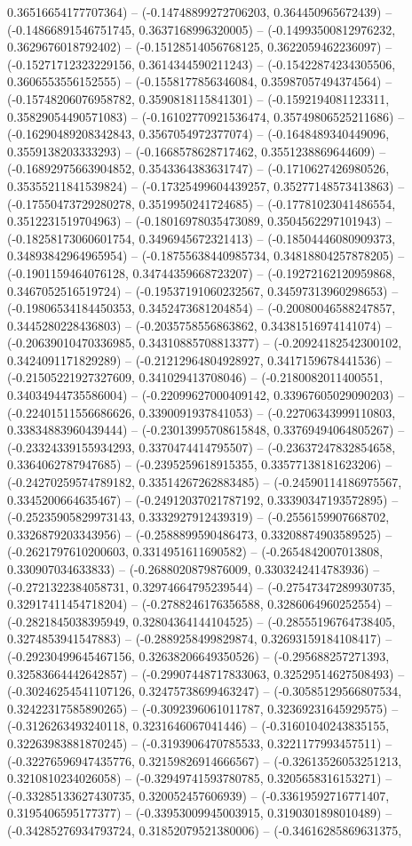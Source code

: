 0.36516654177707364) -- (-0.14748899272706203, 0.364450965672439) -- (-0.14866891546751745, 0.3637168996320005) -- (-0.14993500812976232, 0.3629676018792402) -- (-0.15128514056768125, 0.3622059462236097) -- (-0.15271712323229156, 0.3614344590211243) -- (-0.15422874234305506, 0.3606553556152555) -- (-0.1558177856346084, 0.35987057494374564) -- (-0.15748206076958782, 0.3590818115841301) -- (-0.1592194081123311, 0.35829054490571083) -- (-0.16102770921536474, 0.35749806525211686) -- (-0.16290489208342843, 0.3567054972377074) -- (-0.1648489340449096, 0.3559138203333293) -- (-0.1668578628717462, 0.3551238869644609) -- (-0.16892975663904852, 0.3543364383631747) -- (-0.1710627426980526, 0.35355211841539824) -- (-0.17325499604439257, 0.35277148573413863) -- (-0.17550473729280278, 0.3519950241724685) -- (-0.17781023041486554, 0.3512231519704963) -- (-0.18016978035473089, 0.3504562297101943) -- (-0.18258173060601754, 0.3496945672321413) -- (-0.18504446080909373, 0.34893842964965954) -- (-0.18755638440985734, 0.34818804257878205) -- (-0.1901159464076128, 0.34744359668723207) -- (-0.19272162120959868, 0.3467052516519724) -- (-0.19537191060232567, 0.34597313960298653) -- (-0.19806534184450353, 0.3452473681204854) -- (-0.20080046588247857, 0.3445280228436803) -- (-0.2035758556863862, 0.34381516974141074) -- (-0.20639010470336985, 0.34310885708813377) -- (-0.20924182542300102, 0.3424091171829289) -- (-0.21212964804928927, 0.3417159678441536) -- (-0.21505221927327609, 0.341029413708046) -- (-0.2180082011400551, 0.34034944735586004) -- (-0.22099627000409142, 0.33967605029090203) -- (-0.22401511556686626, 0.3390091937841053) -- (-0.22706343999110803, 0.33834883960439444) -- (-0.23013995708615848, 0.33769494064805267) -- (-0.23324339155934293, 0.3370474414795507) -- (-0.23637247832854658, 0.3364062787947685) -- (-0.2395259618915355, 0.33577138181623206) -- (-0.24270259574789182, 0.33514267262883485) -- (-0.24590114186975567, 0.3345200664635467) -- (-0.24912037021787192, 0.33390347193572895) -- (-0.25235905829973143, 0.3332927912439319) -- (-0.2556159907668702, 0.3326879203343956) -- (-0.2588899590486473, 0.33208874903589525) -- (-0.2621797610200603, 0.3314951611690582) -- (-0.2654842007013808, 0.330907034633833) -- (-0.2688020879876009, 0.3303242414783936) -- (-0.2721322384058731, 0.32974664795239544) -- (-0.27547347289930735, 0.32917411454718204) -- (-0.2788246176356588, 0.3286064960252554) -- (-0.2821845038395949, 0.32804364144104525) -- (-0.28555196764738405, 0.3274853941547883) -- (-0.2889258499829874, 0.32693159184108417) -- (-0.29230499645467156, 0.32638206649350526) -- (-0.295688257271393, 0.32583664442642857) -- (-0.29907448717833063, 0.32529514627508493) -- (-0.30246254541107126, 0.32475738699463247) -- (-0.30585129566807534, 0.32422317585890265) -- (-0.3092396061011787, 0.32369231645929575) -- (-0.3126263493240118, 0.3231646067041446) -- (-0.31601040243835155, 0.32263983881870245) -- (-0.3193906470785533, 0.3221177993457511) -- (-0.32276596947435776, 0.32159826914666567) -- (-0.32613526053251213, 0.3210810234026058) -- (-0.32949741593780785, 0.3205658316153271) -- (-0.33285133627430735, 0.320052457606939) -- (-0.33619592716771407, 0.3195406595177377) -- (-0.33953009945003915, 0.3190301898010489) -- (-0.34285276934793724, 0.31852079521380006) -- (-0.34616285869631375, 